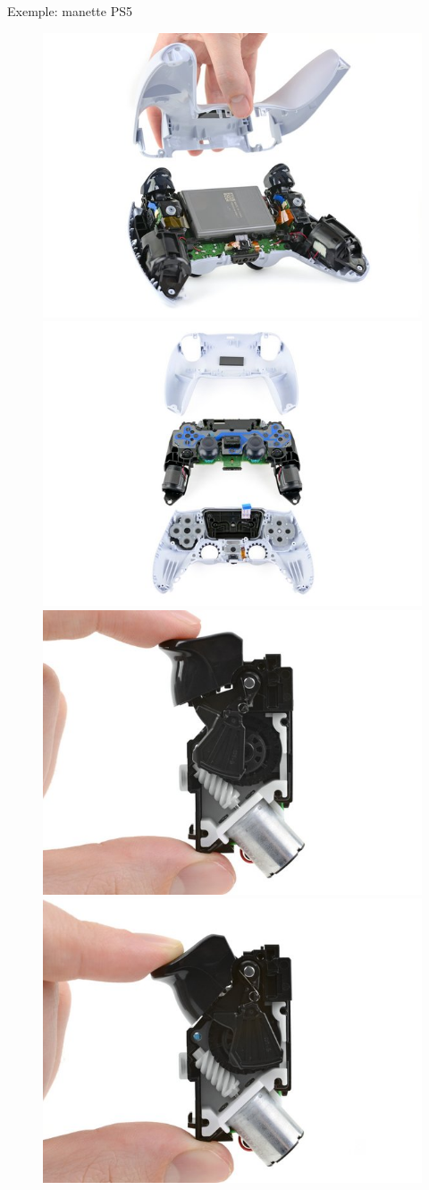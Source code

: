 {
\begin{frame}{Exemple: manette PS5}
\begin{figure}
\centering
\includegraphics[width=0.4\linewidth]{images/ps5_open}
\includegraphics[width=0.4\linewidth]{images/ps5_breakdown}
\includegraphics[width=0.4\linewidth]{images/ps5_trigger}
\includegraphics[width=0.4\linewidth]{images/ps5_trigger2}
\end{figure}
\end{frame}
}

